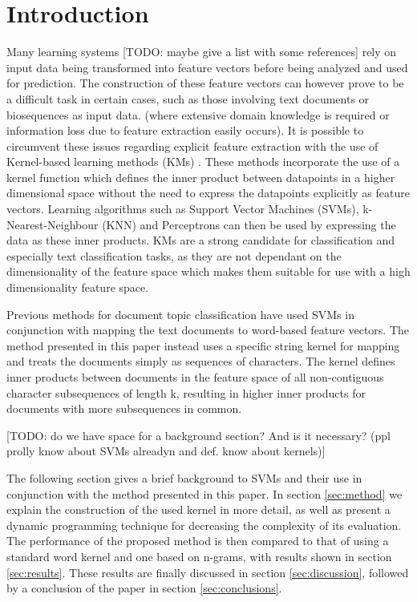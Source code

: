 \section{Introduction} \label{sec:intro}
Many learning systems [TODO: maybe give a list with some references] rely on input data being transformed into feature vectors before being analyzed and used for prediction. The construction of these feature vectors can however prove to be a difficult task in certain cases, such as those involving text documents or biosequences as input data. (where extensive domain knowledge is required or information loss due to feature extraction easily occurs).
It is possible to circumvent these issues regarding explicit feature extraction with the use of Kernel-based learning methods (KMs) \cite{Vapnik95}. These methods incorporate the use of a kernel function which defines the inner product between datapoints in a higher dimensional space without the need to express the datapoints explicitly as feature vectors. Learning algorithms such as Support Vector Machines (SVMs), k-Nearest-Neighbour (KNN) and Perceptrons can then be used by expressing the data as these inner products. KMs are a strong candidate for classification and especially text classification tasks, as they are not dependant on the dimensionality of the feature space which makes them suitable for use with a high dimensionality feature space. 

Previous methods for document topic classification \cite{Joachims1998} have used SVMs in conjunction with mapping the text documents to word-based feature vectors. The method presented in this paper instead uses a specific string kernel for mapping and treats the documents simply as sequences of characters. The kernel defines inner products between documents in the feature space of all non-contiguous character subsequences of length k, resulting in higher inner products for documents with more subsequences in common. 

[TODO: do we have space for a background section? And is it necessary? (ppl prolly know about SVMs alreadyn and def. know about kernels)]

The following section gives a brief background to SVMs and their use in conjunction with the method presented in this paper. In section \ref{sec:method} we explain the construction of the used kernel in more detail, as well as present a dynamic programming technique for decreasing the complexity of its evaluation. The performance of the proposed method is then compared to that of using a standard word kernel and one based on n-grams, with results shown in section \ref{sec:results}. These results are finally discussed in section \ref{sec:discussion}, followed by a conclusion of the paper in section \ref{sec:conclusions}.